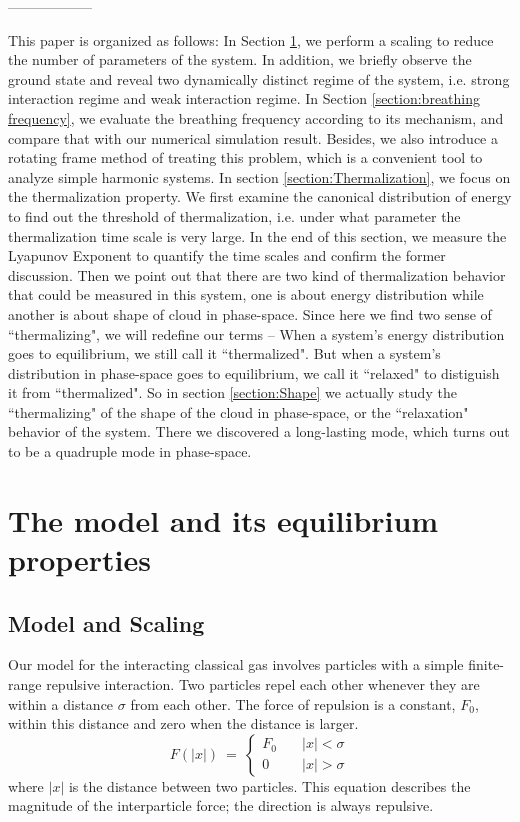 \documentclass[aps,preprintnumbers,onecolumn,amsmath,amssymb,floatfix,pra]{revtex4-1}
\begin{document}
------------------


This paper is organized as follows: In Section \ref{section:preparation}, we perform a scaling to
reduce the number of parameters of the system. In addition, we briefly observe the ground state and
reveal two dynamically distinct regime of the system, i.e. strong interaction regime and weak
interaction regime. In Section \ref{section:breathing frequency}, we evaluate the breathing
frequency according to its mechanism, and compare that with our numerical simulation
result. Besides, we also introduce a rotating frame method of treating this problem, which is a
convenient tool to analyze simple harmonic systems. In section \ref{section:Thermalization}, we
focus on the thermalization property. We first examine the canonical distribution of energy to find
out the threshold of thermalization, i.e. under what parameter the thermalization time scale is very
large. In the end of this section, we measure the Lyapunov Exponent to quantify the time scales and
confirm the former discussion. Then we point out that there are two kind of thermalization behavior
that could be measured in this system, one is about energy distribution while another is about shape
of cloud in phase-space. Since here we find two sense of ``thermalizing", we will redefine our terms
-- When a system's energy distribution goes to equilibrium, we still call it ``thermalized".  But
when a system's distribution in phase-space goes to equilibrium, we call it ``relaxed" to distiguish
it from ``thermalized". So in section \ref{section:Shape} we actually study the ``thermalizing" of
the shape of the cloud in phase-space, or the ``relaxation" behavior of the system. There we
discovered a long-lasting mode, which turns out to be a quadruple mode in phase-space.




\section{The model and its equilibrium properties}\label{section:preparation}

\subsection{Model and Scaling}

Our model for the interacting classical gas involves particles with a simple finite-range repulsive
interaction.  Two particles repel each other whenever they are within a distance $\sigma$ from each
other.  The force of repulsion is a constant, $F_0$, within this distance and zero when the distance
is larger. 
%
\begin{equation}
F(|x|) ~=~ \begin{cases}
F_0  &\quad |x|<\sigma\\
0  &\quad |x|>\sigma
\end{cases}
\label{eq:preparation1}
\end{equation}
where $|x|$ is the distance between two particles.  This equation describes the magnitude of the
interparticle force; the direction is always repulsive.
\end{document}

